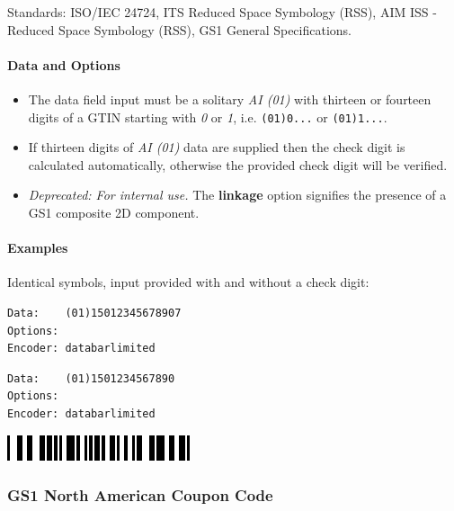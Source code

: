 Standards: ISO/IEC 24724, ITS Reduced Space Symbology (RSS), AIM ISS -
Reduced Space Symbology (RSS), GS1 General Specifications.

\hypertarget{data-and-options-40}{%
\paragraph{Data and Options}\label{data-and-options-40}}

\begin{itemize}
\tightlist
\item
  The data field input must be a solitary \emph{AI (01)} with thirteen
  or fourteen digits of a GTIN starting with \emph{0} or \emph{1}, i.e.
  \texttt{(01)0...} or \texttt{(01)1...}.
\item
  If thirteen digits of \emph{AI (01)} data are supplied then the check
  digit is calculated automatically, otherwise the provided check digit
  will be verified.
\item
  \emph{Deprecated: For internal use.} The \textbf{linkage} option
  signifies the presence of a GS1 composite 2D component.
\end{itemize}

\hypertarget{examples-30}{%
\paragraph{Examples}\label{examples-30}}

Identical symbols, input provided with and without a check digit:

\begin{verbatim}
Data:    (01)15012345678907
Options: 
Encoder: databarlimited
\end{verbatim}

\begin{verbatim}
Data:    (01)1501234567890
Options: 
Encoder: databarlimited
\end{verbatim}

\includegraphics{images/databarlimited-1.eps}

\hypertarget{gs1-north-american-coupon-code}{%
\subsubsection{GS1 North American Coupon
Code}\label{gs1-north-american-coupon-code}}

